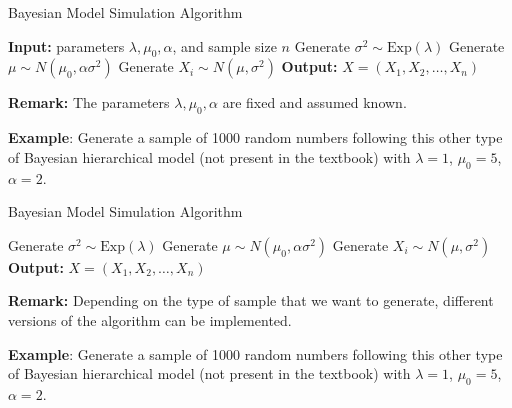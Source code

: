 \documentclass[8pt]{beamer}
\begin{document}
\begin{frame}{Bayesian Model Simulation Algorithm}
\begin{algorithm}[H]
\caption{Generate data from the Bayesian model}\label{alg:bayesian-model}
\begin{algorithmic}[1]
  \State \textbf{Input:} parameters $\lambda, \mu_0, \alpha$, and sample size $n$
  \State Generate $\sigma^2 \sim \text{Exp}(\lambda)$
  \State Generate $\mu \sim N(\mu_0, \alpha\sigma^2)$
    \State Generate $X_i \sim N(\mu, \sigma^2)$
  \EndFor
  \State \textbf{Output:} $X = (X_1, X_2, \dots, X_n)$
\end{algorithmic}
\end{algorithm}

\vspace{2mm}

\textbf{Remark:} The parameters $\lambda, \mu_0, \alpha$ are fixed and assumed known.

\vspace{2mm}

\textbf{Example}: Generate a sample of 1000 random numbers following this other type of Bayesian hierarchical model (not present in the textbook) with $\lambda=1$, $\mu_0=5$, $\alpha=2$.
\end{frame}

\begin{frame}{Bayesian Model Simulation Algorithm}
\begin{algorithm}[H]
\caption{Simulation from a Bayesian Model}\label{alg:bayesian-sim}
\begin{algorithmic}[1]
    \State Generate $\sigma^2 \sim \text{Exp}(\lambda)$
    \State Generate $\mu \sim N(\mu_0, \alpha \sigma^2)$
    \State Generate $X_i \sim N(\mu, \sigma^2)$
  \EndFor
  \State \textbf{Output:} $X = (X_1, X_2, \dots, X_n)$
\end{algorithmic}
\end{algorithm}

\vspace{2mm}

\textbf{Remark:} Depending on the type of sample that we want to generate, 
different versions of the algorithm can be implemented.

\vspace{2mm}

\textbf{Example}: Generate a sample of 1000 random numbers following this other type of Bayesian hierarchical model (not present in the textbook) with $\lambda=1$, $\mu_0=5$, $\alpha=2$.
\end{frame}
\end{document}

